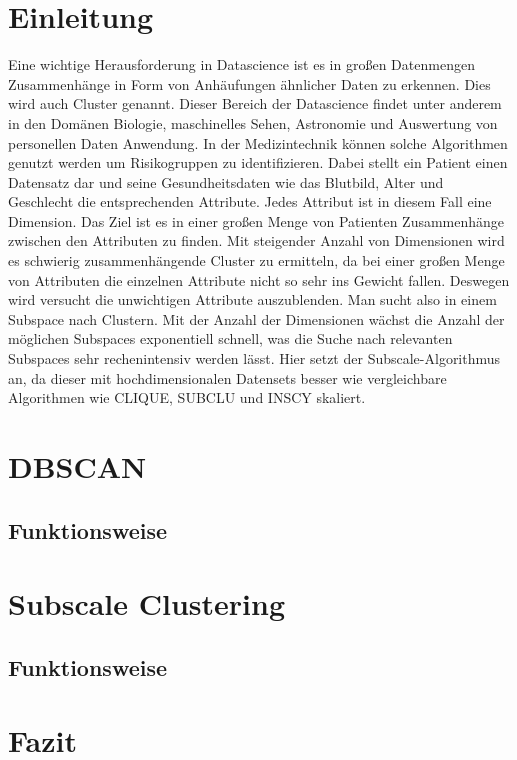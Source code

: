 \documentclass[utf8,biblatex]{lni}
\begin{document}
\section{Einleitung}
Eine wichtige Herausforderung in Datascience ist es in großen
Datenmengen Zusammenhänge in Form von Anhäufungen ähnlicher Daten
zu erkennen. Dies wird auch Cluster genannt.
Dieser Bereich der Datascience findet unter anderem in den
Domänen Biologie, maschinelles Sehen, Astronomie und Auswertung
von personellen Daten Anwendung.
In der Medizintechnik können solche Algorithmen genutzt werden
um Risikogruppen zu identifizieren.
Dabei stellt ein Patient einen Datensatz dar und seine
Gesundheitsdaten wie das Blutbild, Alter und Geschlecht
die entsprechenden Attribute.
Jedes Attribut ist in diesem Fall eine Dimension.
Das Ziel ist es in einer großen Menge von
Patienten Zusammenhänge zwischen den Attributen zu finden.
Mit steigender Anzahl von Dimensionen wird es schwierig
zusammenhängende Cluster zu ermitteln,
da bei einer großen Menge von Attributen die einzelnen
Attribute nicht so sehr ins Gewicht fallen.
Deswegen wird versucht die unwichtigen Attribute auszublenden.
Man sucht also in einem Subspace nach Clustern.
Mit der Anzahl der Dimensionen wächst die Anzahl der
möglichen Subspaces exponentiell schnell, was die
Suche nach relevanten Subspaces sehr rechenintensiv
werden lässt. Hier setzt der Subscale-Algorithmus an,
da dieser mit hochdimensionalen Datensets besser wie
vergleichbare Algorithmen wie CLIQUE, SUBCLU und INSCY
skaliert.

\section{DBSCAN}

\subsection{Funktionsweise}
\section{Subscale Clustering}
\subsection{Funktionsweise}
\section{Fazit}



\printbibliography
\end{document}
